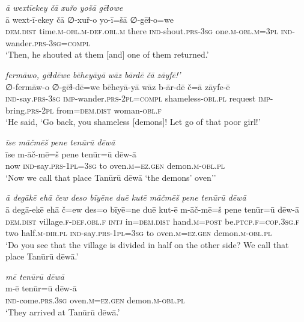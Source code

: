 \ea \label{ZP.68}
\textit{ā wextīekey čā xuřo yošā gēɫowe} \\ 
\gll ā wext-ī-ekey čā ∅-xuř-o yo-ī=šā ∅-gēɫ-o=we \\ 
 \textsc{dem.dist} time\textsc{.m}\textsc{-obl}\textsc{.m}\textsc{-def}\textsc{.obl}\textsc{.m} there \textsc{ind-}shout\textsc{.prs}\textsc{-3sg} one\textsc{.m}\textsc{-obl}\textsc{.m}\textsc{=3pl} \textsc{ind-}wander\textsc{.prs}\textsc{-3sg}\textsc{=compl} \\ 
\glt `Then, he shouted at them [and] one of them returned.'
\z 
 
\ea \label{ZP.70}
\textit{fermāwo, gēɫdēwe bēheyāyā wāz bārdē čā zāyfē!’} \\ 
\gll ∅-fermāw-o ∅-gēɫ-dē=we bēheyā-yā wāz b-ār-dē č=ā zāyfe-ē \\ 
 \textsc{ind-}say\textsc{.prs}\textsc{-3sg} \textsc{imp-}wander\textsc{.prs}-\textsc{2pl}\textsc{=compl} shameless\textsc{-obl}\textsc{.pl} request \textsc{imp-}bring\textsc{.prs}-\textsc{2pl} from=\textsc{dem.dist} woman\textsc{-obl}\textsc{.f} \\ 
\glt `He said, ‘Go back, you shameless [demons]! Let go of that poor girl!'
\z 
 
\ea \label{ZP.73}
\textit{īse māčmēš pene tenūrū dēwā} \\ 
\gll īse m-āč-mē=š pene tenūr=ū dēw-ā \\ 
 now \textsc{ind-}say\textsc{.prs}\textsc{-1pl}\textsc{=3sg} to oven\textsc{.m}\textsc{\textsc{=ez.gen}} demon\textsc{.m}\textsc{-obl}\textsc{.pl} \\ 
\glt `Now we call that place Tanūrū dēwā ‘the demons’ oven’'
\z 
 
\ea \label{ZP.74}
\textit{ā degākē ehā čew deso bīyēne duē kutē māčmēš pene tenūrū dēwā} \\ 
\gll ā degā-ekē ehā č=ew des=o bīyē=ne duē kut-ē m-āč-mē=š pene tenūr=ū dēw-ā \\ 
 \textsc{dem.dist} village\textsc{.f}\textsc{-def}\textsc{.obl}\textsc{.f} \textsc{intj} in=\textsc{dem.dist} hand\textsc{.m}\textsc{=\textsc{post}} be\textsc{.ptcp}\textsc{.f}\textsc{=cop}\textsc{.3sg}\textsc{.f} two half\textsc{.m}\textsc{-dir}\textsc{.pl} \textsc{ind-}say\textsc{.prs}\textsc{-1pl}\textsc{=3sg} to oven\textsc{.m}\textsc{\textsc{=ez.gen}} demon\textsc{.m}\textsc{-obl}\textsc{.pl} \\ 
\glt `Do you see that the village is divided in half on the other side? We call that place Tanūrū dēwā.'
\z 
 
\ea \label{ZP.77}
\textit{mē tenūrū dēwā} \\ 
\gll m-ē tenūr=ū dēw-ā \\ 
 \textsc{ind-}come\textsc{.prs}\textsc{.3sg} oven\textsc{.m}\textsc{\textsc{=ez.gen}} demon\textsc{.m}\textsc{-obl}\textsc{.pl} \\ 
\glt `They arrived at Tanūrū dēwā.'
\z 
 
